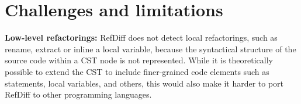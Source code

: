 \section{Challenges and limitations}


\textbf{Low-level refactorings:} RefDiff does not detect local refactorings, such as rename, extract or inline a local variable, because the syntactical structure of the source code within a CST node is not represented.
While it is theoretically possible to extend the CST to include finer-grained code elements such as statements, local variables, and others, this would also make it harder to port RefDiff to other programming languages.




